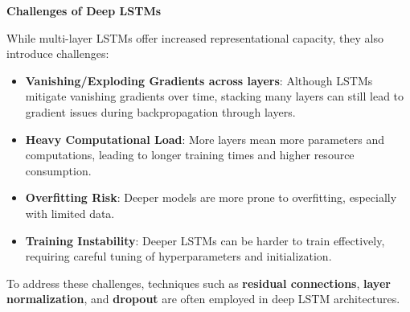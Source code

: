 \highspace
\begin{flushleft}
    \textcolor{Red2}{ \textbf{Challenges of Deep LSTMs}}
\end{flushleft}
While multi-layer LSTMs offer increased representational capacity, they also introduce challenges:
\begin{itemize}
    \item[\textcolor{Red2}{\faIcon{times}}] \textbf{Vanishing/Exploding Gradients across layers}: Although LSTMs mitigate vanishing gradients over time, stacking many layers can still lead to gradient issues during backpropagation through layers.
    \item[\textcolor{Red2}{\faIcon{times}}] \textbf{Heavy Computational Load}: More layers mean more parameters and computations, leading to longer training times and higher resource consumption.
    \item[\textcolor{Red2}{\faIcon{times}}] \textbf{Overfitting Risk}: Deeper models are more prone to overfitting, especially with limited data.
    \item[\textcolor{Red2}{\faIcon{times}}] \textbf{Training Instability}: Deeper LSTMs can be harder to train effectively, requiring careful tuning of hyperparameters and initialization. 
\end{itemize}
To address these challenges, techniques such as \textbf{residual connections}, \textbf{layer normalization}, and \textbf{dropout} are often employed in deep LSTM architectures.